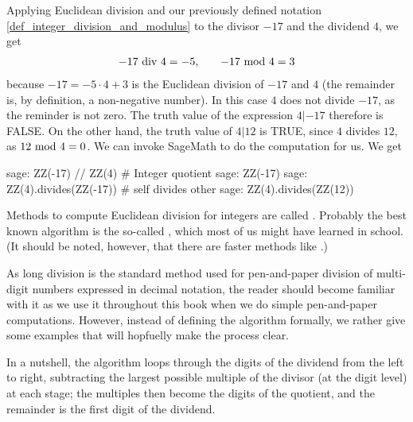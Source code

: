\begin{example} Applying Euclidean division and our previously defined notation \ref{def_integer_division_and_modulus} to the divisor $-17$ and the dividend $4$, we get 
\begin{equation*}
\begin{array}{lcr}
-17 \text{ div } 4 = - 5, & & -17 \text{ mod } 4 = 3
\end{array}
\end{equation*}
because $ -17 = -5 \cdot 4 + 3 $  is the Euclidean division of $-17$ and $4$ (the remainder is, by definition, a non-negative number). In this case $4$ does not divide $-17$, as the reminder is not zero. The truth value of the expression $4 | -17 $ therefore is FALSE. On the other hand, the truth value of $4 | 12$ is TRUE, since $4$ divides $12$, as $ 12 \text{ mod } 4 = 0 $. We can invoke SageMath to do the computation for us. We get
\begin{sagecommandline}
sage: ZZ(-17) // ZZ(4) # Integer quotient 
sage: ZZ(-17) %
sage: ZZ(4).divides(ZZ(-17)) # self divides other
sage: ZZ(4).divides(ZZ(12))
\end{sagecommandline}
\end{example}
Methods to compute Euclidean division for integers are called . Probably the best known algorithm is the so-called , which most of us might have learned in school. (It should be noted, however, that there are faster methods like .)

As long division is the standard method used for pen-and-paper division of multi-digit numbers expressed in decimal notation, the reader should become familiar with it as we use it throughout this book when we do simple pen-and-paper computations. However, instead of defining the algorithm formally, we rather give some examples that will hopfuelly  make the process clear.

In a nutshell, the algorithm loops through the digits of the dividend from the left to right, subtracting the largest possible multiple of the divisor (at the digit level) at each stage; the multiples then become the digits of the quotient, and the remainder is the first digit of the dividend. 

